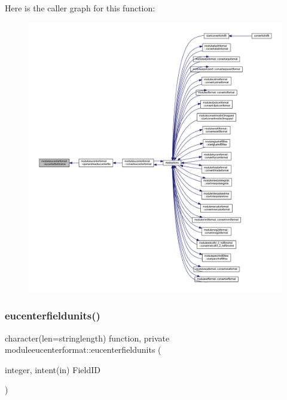Here is the caller graph for this function\+:\nopagebreak
\begin{figure}[H]
\begin{center}
\leavevmode
\includegraphics[width=350pt]{namespacemoduleeucenterformat_a2270a8364737dc694ff865c8eb8a8788_icgraph}
\end{center}
\end{figure}
\mbox{\label{namespacemoduleeucenterformat_a96acc03f8210b20aa7bb87e45e512333}} 
\subsubsection{\texorpdfstring{eucenterfieldunits()}{eucenterfieldunits()}}
{\footnotesize\ttfamily character(len=stringlength) function, private moduleeucenterformat\+::eucenterfieldunits (\begin{DoxyParamCaption}\item[{integer, intent(in)}]{Field\+ID }\end{DoxyParamCaption})\hspace{0.3cm}{\ttfamily [private]}}


